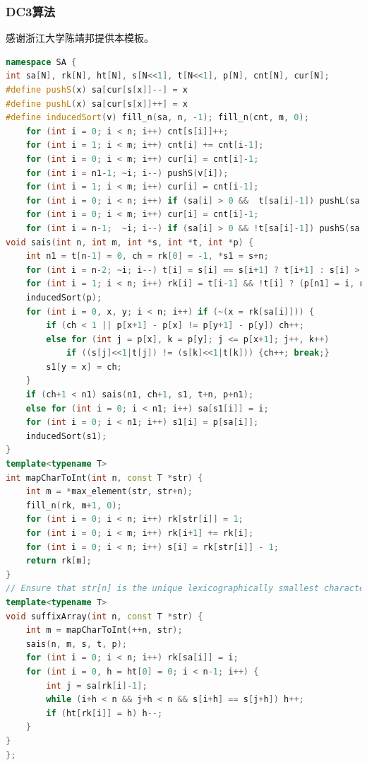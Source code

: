 \documentclass{article}
\begin{document}
\subsubsection{DC3算法}

感谢浙江大学陈靖邦提供本模板。

\begin{lstlisting}[language=C++]
namespace SA {
int sa[N], rk[N], ht[N], s[N<<1], t[N<<1], p[N], cnt[N], cur[N];
#define pushS(x) sa[cur[s[x]]--] = x
#define pushL(x) sa[cur[s[x]]++] = x
#define inducedSort(v) fill_n(sa, n, -1); fill_n(cnt, m, 0);                  \
    for (int i = 0; i < n; i++) cnt[s[i]]++;                                  \
    for (int i = 1; i < m; i++) cnt[i] += cnt[i-1];                           \
    for (int i = 0; i < m; i++) cur[i] = cnt[i]-1;                            \
    for (int i = n1-1; ~i; i--) pushS(v[i]);                                  \
    for (int i = 1; i < m; i++) cur[i] = cnt[i-1];                            \
    for (int i = 0; i < n; i++) if (sa[i] > 0 &&  t[sa[i]-1]) pushL(sa[i]-1); \
    for (int i = 0; i < m; i++) cur[i] = cnt[i]-1;                            \
    for (int i = n-1;  ~i; i--) if (sa[i] > 0 && !t[sa[i]-1]) pushS(sa[i]-1)
void sais(int n, int m, int *s, int *t, int *p) {
    int n1 = t[n-1] = 0, ch = rk[0] = -1, *s1 = s+n;
    for (int i = n-2; ~i; i--) t[i] = s[i] == s[i+1] ? t[i+1] : s[i] > s[i+1];
    for (int i = 1; i < n; i++) rk[i] = t[i-1] && !t[i] ? (p[n1] = i, n1++) : -1;
    inducedSort(p);
    for (int i = 0, x, y; i < n; i++) if (~(x = rk[sa[i]])) {
        if (ch < 1 || p[x+1] - p[x] != p[y+1] - p[y]) ch++;
        else for (int j = p[x], k = p[y]; j <= p[x+1]; j++, k++)
            if ((s[j]<<1|t[j]) != (s[k]<<1|t[k])) {ch++; break;}
        s1[y = x] = ch;
    }
    if (ch+1 < n1) sais(n1, ch+1, s1, t+n, p+n1);
    else for (int i = 0; i < n1; i++) sa[s1[i]] = i;
    for (int i = 0; i < n1; i++) s1[i] = p[sa[i]];
    inducedSort(s1);
}
template<typename T>
int mapCharToInt(int n, const T *str) {
    int m = *max_element(str, str+n);
    fill_n(rk, m+1, 0);
    for (int i = 0; i < n; i++) rk[str[i]] = 1;
    for (int i = 0; i < m; i++) rk[i+1] += rk[i];
    for (int i = 0; i < n; i++) s[i] = rk[str[i]] - 1;
    return rk[m];
}
// Ensure that str[n] is the unique lexicographically smallest character in str.
template<typename T>
void suffixArray(int n, const T *str) {
    int m = mapCharToInt(++n, str);
    sais(n, m, s, t, p);
    for (int i = 0; i < n; i++) rk[sa[i]] = i;
    for (int i = 0, h = ht[0] = 0; i < n-1; i++) {
        int j = sa[rk[i]-1];
        while (i+h < n && j+h < n && s[i+h] == s[j+h]) h++;
        if (ht[rk[i]] = h) h--;
    }
}
};
\end{lstlisting}
\end{document}
